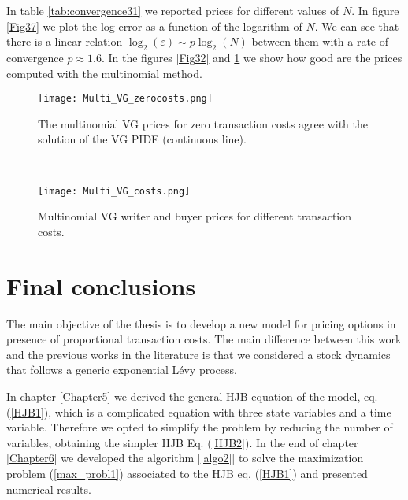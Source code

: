 In table \ref{tab:convergence31} we reported prices for different values of $N$.
In figure \ref{Fig37} we plot the log-error as a function of the logarithm of $N$. We can see that there is a linear relation 
$\log_2(\varepsilon) \sim p \log_2(N)$ between them with a rate of convergence $p \approx 1.6$. 
In the figures \ref{Fig32} and \ref{Fig33} we show how good are the prices computed with the multinomial method. 
\begin{figure}[t!]
 \begin{minipage}[b]{0.5\linewidth}
   \centering
   \texttt{[image: Multi\_VG\_zerocosts.png]}
   \caption{The multinomial VG prices for zero transaction costs agree with the solution of the VG PIDE (continuous line).}
   \label{Fig32} 
 \end{minipage}
 \ \hspace{2mm} \hspace{3mm} \
 \begin{minipage}[b]{0.5\linewidth}
   \texttt{[image: Multi\_VG\_costs.png]}
   \caption{Multinomial VG writer and buyer prices for different transaction costs.}
   \label{Fig33}
 \end{minipage}
\end{figure}  






\section{Final conclusions}



The main objective of the thesis is to develop a new model for pricing options in presence of proportional transaction costs.
The main difference between this work and the previous works in the literature is that we considered a stock
dynamics that follows a generic exponential Lévy process. 

In chapter \ref{Chapter5} we derived the general HJB equation of the model, eq. (\ref{HJB1}), which is 
a complicated equation with three state variables and a time variable. 
Therefore we opted to simplify the problem by reducing the number of variables, obtaining the simpler HJB Eq. (\ref{HJB2}).
In the end of chapter \ref{Chapter6} we developed the algorithm [\ref{algo2}] to solve the maximization problem (\ref{max_probl1}) associated to the HJB eq. (\ref{HJB1})
and presented numerical results. 

